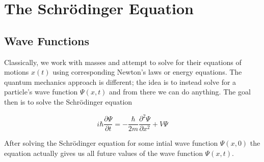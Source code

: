 \documentclass[11pt]{article}
\begin{document}
\section{The Schr\"odinger Equation}

\subsection{Wave Functions}
Classically, we work with masses and attempt to solve for their equations of motions \( x(t) \) using corresponding
Newton's laws or energy equations. The quantum mechanics approach is different; the idea is to instead solve for a
particle's wave function \( \Psi(x,t) \) and from there we can do anything. The goal then is to solve the Schr\"odinger
equation

\[ 
    i\hbar \frac{\partial \Psi}{\partial t} = -\frac{\hbar}{2m}\frac{\partial^{2} \Psi}{\partial x^{2}} + V\Psi
\]

\noindent After solving the Schr\"odinger equation for some intial wave function \( \Psi(x, 0) \) the equation actually gives us 
all future values of the wave function \( \Psi(x, t) \).
\end{document}
